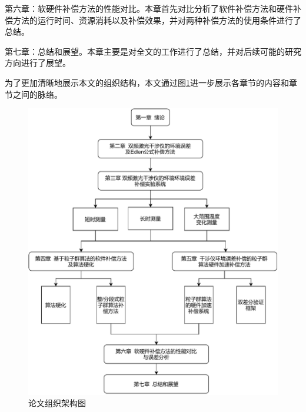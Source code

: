 第六章：软硬件补偿方法的性能对比。本章首先对比分析了软件补偿方法和硬件补偿方法的运行时间、资源消耗以及补偿效果，并对两种补偿方法的使用条件进行了总结。

第七章：总结和展望。本章主要是对全文的工作进行了总结，并对后续可能的研究方向进行了展望。

为了更加清晰地展示本文的组织结构，本文通过图\ref{fig:论文组织架构图}进一步展示各章节的内容和章节之间的脉络。
\begin{figure}[htb]
    \centering
    \includegraphics[width=13cm]{fig/1-fig/论文组织架构图.drawio.pdf}
    \caption{论文组织架构图}
    \label{fig:论文组织架构图}
\end{figure}